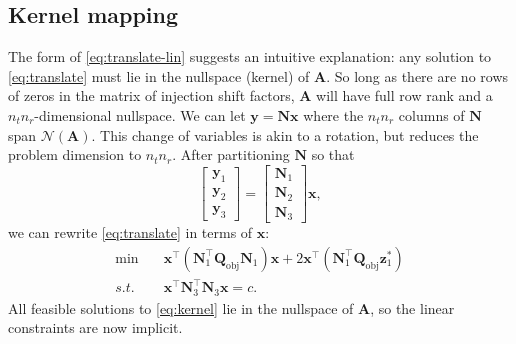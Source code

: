 \documentclass[journal,twoside]{IEEEtran}
\renewcommand{\vec}[1]{\mathbf{#1}}
\begin{document}
\subsection{Kernel mapping}\label{sec:solution-kernel}
The form of \eqref{eq:translate-lin} suggests an intuitive explanation: any solution to \eqref{eq:translate} must lie in the nullspace (kernel) of $\mathbf{A}$. So long as there are no rows of zeros in the matrix of injection shift factors, $\mathbf{A}$ will have full row rank and a $n_t n_r$-dimensional nullspace. We can let $\vec{y}=\mathbf{N}\vec{x}$ where the $n_t n_r$ columns of $\mathbf{N}$ span $\mathcal{N}(\mathbf{A})$. This change of variables is akin to a rotation, but reduces the problem dimension to $n_t n_r$. After partitioning $\mathbf{N}$ so that
\[
\begin{bmatrix} \vec{y}_1 \\ \vec{y}_2 \\ \vec{y}_3 \end{bmatrix} = \begin{bmatrix} \mathbf{N}_1
  \\ \mathbf{N}_2 \\ \mathbf{N}_3 \end{bmatrix} \vec{x},
\]
we can rewrite \eqref{eq:translate} in terms of $\vec{x}$:
\begin{subequations}\label{eq:kernel}
\begin{align}
\label{eq:kernel-obj} \min\quad  &\vec{x}^\top (\mathbf{N}_1^\top \mathbf{Q}_\text{obj}\mathbf{N}_1) \vec{x} + 2\vec{x}^\top
(\mathbf{N}_1^\top \mathbf{Q}_\text{obj} \vec{z}_1^*) \\
\label{eq:kernel-quad} s.t.\quad &\vec{x}^\top \mathbf{N}_3^\top \mathbf{N}_3 \vec{x} = c.
\end{align}
\end{subequations}
All feasible solutions to \eqref{eq:kernel} lie in the nullspace of $\mathbf{A}$, so the linear constraints are now implicit.
\end{document}
